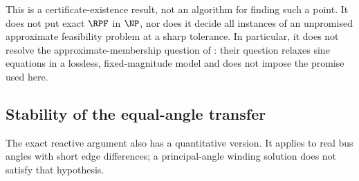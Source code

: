 This is a certificate-existence result, not an algorithm for finding such
a point. It does not put exact $\RPF$ in $\NP$, nor does it decide all
instances of an unpromised approximate feasibility problem at a sharp
tolerance. In particular, it does not resolve the approximate-membership
question of \citet[Section 1.3 of the arXiv version]{BienstockVerma2019}:
their question relaxes sine equations in a lossless, fixed-magnitude model
and does not impose the promise used here.

\subsection{Stability of the equal-angle transfer}

The exact reactive argument also has a quantitative version. It applies to
real bus angles with short edge differences; a principal-angle winding
solution does not satisfy that hypothesis.

